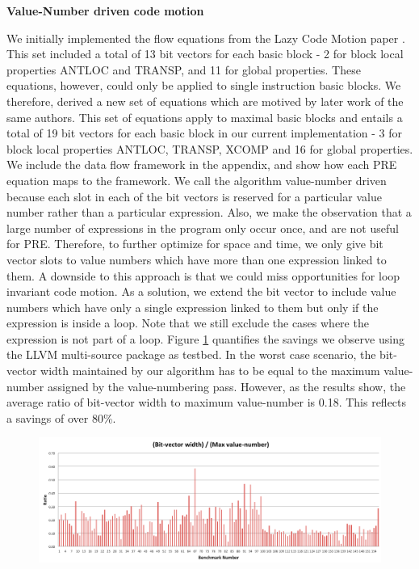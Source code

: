 \documentclass[10pt,twoside]{report}
\begin{document}
\begin{flushleft}
\textbf{\large{Value-Number driven code motion}}
\end{flushleft}
We initially implemented the flow equations from the Lazy Code Motion paper \cite{Knoop}.
This set included a total of 13 bit vectors for each basic block - 2 for block local
properties ANTLOC and TRANSP, and 11 for global properties. These equations,
           however, could only be applied to single instruction basic blocks.
           We therefore, derived a new set of equations which are motived by
           later work\cite{Knoop:1994:OCM:183432.183443} of the same authors.
           This set of equations apply to maximal basic blocks and
           entails a total of 19 bit vectors for each basic block in our
           current implementation - 3 for block local properties ANTLOC,
           TRANSP, XCOMP and 16 for global properties.  We include the
           data flow framework in the appendix, and show how each PRE equation 
	  maps to the framework. We call the algorithm value-number driven because each
           slot in each of the bit vectors is reserved for a particular value
           number rather than a particular expression. Also, we make the
           observation that a large number of expressions in the program only
           occur once, and are not useful for PRE. Therefore, to further optimize
           for space and time, we only give bit vector slots to value numbers
           which have more than one expression linked to them. A downside to this
approach is that we could miss opportunities for loop invariant code motion. As a
      solution, we extend the bit vector to include value numbers which have
      only a single expression linked to them but only if the expression is
      inside a loop. Note that we still exclude the cases where the expression
      is not part of a loop. Figure \ref{fig:barC} quantifies the savings we observe using the LLVM
multi-source package as testbed. In the worst case scenario, the bit-vector width maintained by our 
algorithm has to be equal to the maximum value-number assigned by the value-numbering pass. However, as 
the results show, the average ratio of bit-vector width to maximum value-number is 0.18. This reflects a savings of
over 80\%.

\begin{figure}[htbp]
 \begin{center}
  \includegraphics[scale=0.4]{Figs/barC} 
 \end{center}
 \caption{\label{fig:barC}} 
\end{figure}
\end{document}
